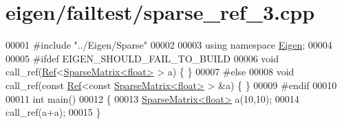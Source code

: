 \hypertarget{eigen_2failtest_2sparse__ref__3_8cpp_source}{}\section{eigen/failtest/sparse\+\_\+ref\+\_\+3.cpp}
\label{eigen_2failtest_2sparse__ref__3_8cpp_source}

\begin{DoxyCode}
00001 \textcolor{preprocessor}{#include "../Eigen/Sparse"}
00002 
00003 \textcolor{keyword}{using namespace }\hyperlink{namespace_eigen}{Eigen};
00004 
00005 \textcolor{preprocessor}{#ifdef EIGEN\_SHOULD\_FAIL\_TO\_BUILD}
00006 \textcolor{keywordtype}{void} call\_ref(\hyperlink{group___core___module_class_eigen_1_1_ref}{Ref}<\hyperlink{group___sparse_core___module_class_eigen_1_1_sparse_matrix}{SparseMatrix<float>} > a) \{ \}
00007 \textcolor{preprocessor}{#else}
00008 \textcolor{keywordtype}{void} call\_ref(\textcolor{keyword}{const} \hyperlink{group___core___module_class_eigen_1_1_ref}{Ref}<\textcolor{keyword}{const} \hyperlink{group___sparse_core___module_class_eigen_1_1_sparse_matrix}{SparseMatrix<float>} > &a) \{ \}
00009 \textcolor{preprocessor}{#endif}
00010 
00011 \textcolor{keywordtype}{int} main()
00012 \{
00013   \hyperlink{group___sparse_core___module_class_eigen_1_1_sparse_matrix}{SparseMatrix<float>} a(10,10);
00014   call\_ref(a+a);
00015 \}
\end{DoxyCode}

